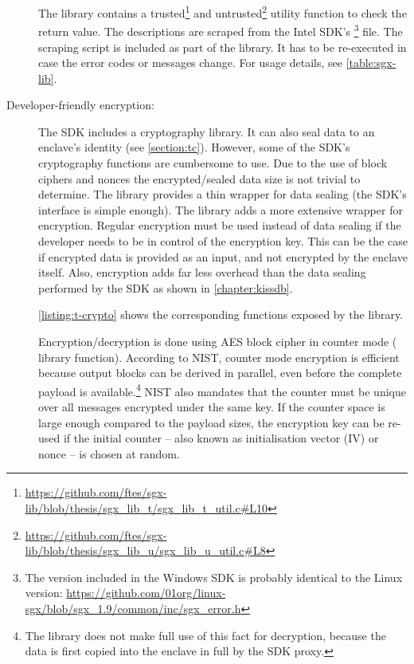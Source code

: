 \begin{description}
The library contains a trusted\footnote{\url{https://github.com/ftes/sgx-lib/blob/thesis/sgx_lib_t/sgx_lib_t_util.c\#L10}} and untrusted\footnote{\url{https://github.com/ftes/sgx-lib/blob/thesis/sgx_lib_u/sgx_lib_u_util.c\#L8}} utility function to check the return value.\label{ID_104103671}
The descriptions are scraped from the Intel SDK's \footnote{The version included in the Windows SDK is probably identical to the Linux version: \url{https://github.com/01org/linux-sgx/blob/sgx_1.9/common/inc/sgx_error.h}} file.\label{ID_1860489535}
The scraping script is included as part of the library. It has to be re-executed in case the error codes or messages change. For usage details, see \autoref{table:sgx-lib}.\label{ID_163886822}
\item[Developer-friendly encryption:]\label{ID_1982795261}
The SDK includes a cryptography library.\label{ID_66289720}
It can also seal data to an enclave's identity (see \autoref{section:tc}).\label{ID_1914463209}
However, some of the SDK's cryptography functions are cumbersome to use.\label{ID_1318478695}
Due to the use of block ciphers and nonces the encrypted/sealed data size is not trivial to determine.\label{ID_1327374936}
The library provides a thin wrapper for data sealing (the SDK's interface is simple enough).\label{ID_156054001}
The library adds a more extensive wrapper for encryption.\label{ID_92034903}
Regular encryption must be used instead of data sealing if the developer needs to be in control of the encryption key. This can be the case if encrypted data is provided as an input, and not encrypted by the enclave itself.\label{ID_1619152047}
Also, encryption adds far less overhead than the data sealing performed by the SDK as shown in \autoref{chapter:kissdb}.\label{ID_212893799}

\autoref{listing:t-crypto} shows the corresponding functions exposed by the library.\label{ID_607112210}
\label{ID_104430003}


Encryption/decryption is done using AES block cipher in counter mode ( library function).\label{ID_1978443632}
According to NIST, counter mode encryption is efficient because output blocks can be derived in parallel, even before the complete payload is available.\footnote{The library does not make full use of this fact for decryption, because the data is first copied into the enclave in full by the SDK proxy.}\cite[]{nist-cipher}\label{ID_583501102}
NIST also mandates that the counter must be unique over all messages encrypted under the same key. If the counter space is large enough compared to the payload sizes, the encryption key can be re-used if the initial counter -- also known as initialisation vector (IV) or nonce -- is chosen at random.\label{ID_1899131917}


\end{description}
